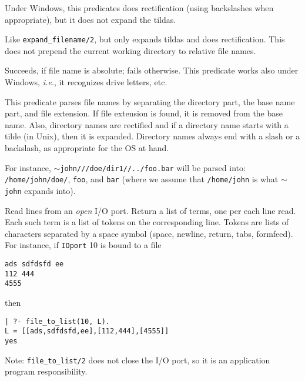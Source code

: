 \begin{description}
Under Windows, this predicates does rectification (using
backslashes when appropriate), but it does not expand the tildas.

Like {\tt expand\_filename/2}, but only expands tildas and does
rectification. This does not prepend the current working directory to
relative file names.

  Succeeds, if file name is absolute; fails
otherwise.  This predicate works also under Windows, {\it
i.e.}, it recognizes drive letters, etc.

This predicate parses file names by separating the directory part, the base
name part, and file extension. If file extension is found, it is removed
from the base name. Also, directory names are rectified and if a directory
name starts with a tilde (in Unix), then it is expanded. Directory names
always end with a slash or a backslash, as appropriate for the OS at hand.

For instance, {\tt $\sim$john///doe/dir1//../foo.bar} will be parsed into:
{\tt /home/john/doe/}, {\tt foo}, and {\tt bar} (where we assume that    
{\tt /home/john} is what {\tt $\sim$john} expands into).  

Read lines from an \emph{open} I/O port. Return a
list of terms, one per each line read. Each such term is a list of tokens
on the corresponding line.  Tokens are lists of characters separated by a
space symbol (space, newline, return, tabs, formfeed). For instance, if
{\tt IOport} 10 is bound to a file
\begin{verbatim}
ads sdfdsfd ee
112 444
4555  
\end{verbatim}
then
\begin{verbatim}
| ?- file_to_list(10, L).  
L = [[ads,sdfdsfd,ee],[112,444],[4555]]
yes
\end{verbatim}
Note: {\tt file\_to\_list/2} does not close the I/O port, so it is an
application program responsibility.




\end{description}
